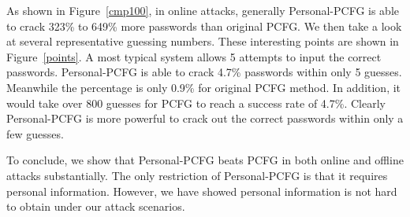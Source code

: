As shown in Figure~\ref{cmp100}, in online attacks, generally Personal-PCFG is able to crack 323\% to 649\% more passwords than original PCFG. We then take a look at several representative guessing numbers. These interesting points are shown in Figure~\ref{points}. A most typical system allows 5 attempts to input the correct passwords. Personal-PCFG is able to crack 4.7\% passwords within only 5 guesses. Meanwhile the percentage is only 0.9\% for original PCFG method. In addition, it would take over 800 guesses for PCFG to reach a success rate of 4.7\%. Clearly Personal-PCFG is more powerful to crack out the correct passwords within only a few guesses. 

To conclude, we show that Personal-PCFG beats PCFG in both online and offline attacks substantially. The only restriction of Personal-PCFG is that it requires personal information. However, we have showed personal information is not hard to obtain under our attack scenarios.


